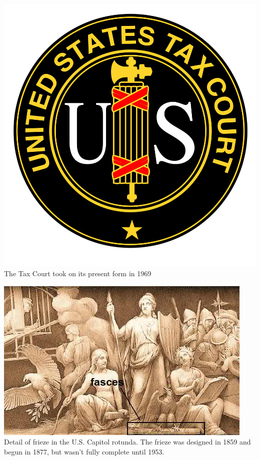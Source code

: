 \begin{frame}
    \centering
    \includegraphics[height=.8\textheight]{img/fasces/tax-court.png} \\
    The Tax Court took on its present form in 1969 \\
\end{frame}
\begin{frame}
    \centering
    \includegraphics[height=.8\textheight]{img/fasces/teut1.jpg} \\
    Detail of frieze in the U.S. Capitol rotunda. The frieze was designed in 1859 and begun in 1877, but wasn't fully complete until 1953. \\
\end{frame}
